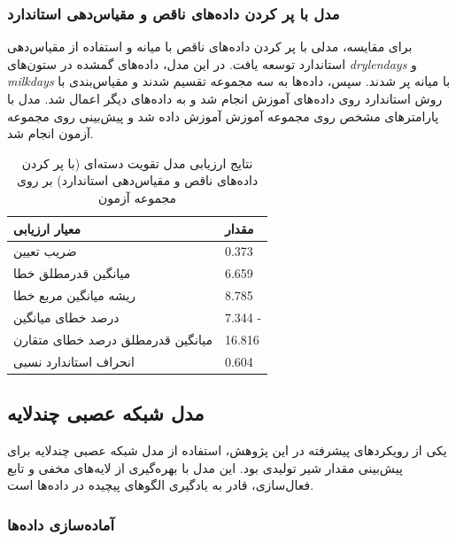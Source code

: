 \subsubsection{مدل با پر کردن داده‌های ناقص و مقیاس‌دهی استاندارد}

برای مقایسه، مدلی با پر کردن داده‌های ناقص با میانه و استفاده از مقیاس‌دهی استاندارد توسعه یافت. در این مدل، داده‌های گمشده در ستون‌های \textit{drylendays} و \textit{milkdays} با میانه پر شدند. سپس، داده‌ها به سه مجموعه تقسیم شدند و مقیاس‌بندی با روش استاندارد روی داده‌های آموزش انجام شد و به داده‌های دیگر اعمال شد. مدل با پارامترهای مشخص روی مجموعه آموزش آموزش داده شد و پیش‌بینی روی مجموعه آزمون انجام شد.

\vspace{0.3cm}
\begin{table}[H]
	\centering
	\caption{نتایج ارزیابی مدل تقویت دسته‌ای (با پر کردن داده‌های ناقص و مقیاس‌دهی استاندارد) بر روی مجموعه آزمون}
	\renewcommand{\arraystretch}{1.3}
	\begin{tabular}{
			>{\centering\arraybackslash}m{4cm}
			>{\centering\arraybackslash}m{3cm}
		}
		\toprule
		\textbf{معیار ارزیابی} & \textbf{مقدار} \\
		\midrule
		ضریب تعیین & \num{0.373} \\
		میانگین قدرمطلق خطا & \num{6.659} \\
		ریشه میانگین مربع خطا & \num{8.785} \\
		درصد خطای میانگین & \num{7.344} - \\
		میانگین قدرمطلق درصد خطای متقارن & \num{16.816} \\
		انحراف استاندارد نسبی & \num{0.604} \\
		\bottomrule
	\end{tabular}
	\label{tab:catboost_standard}
\end{table}
\vspace{0.5cm}



\subsection{مدل شبکه عصبی چندلایه}

یکی از رویکردهای پیشرفته در این پژوهش، استفاده از مدل شبکه عصبی چندلایه برای پیش‌بینی مقدار شیر تولیدی بود. این مدل با بهره‌گیری از لایه‌های مخفی و تابع فعال‌سازی، قادر به یادگیری الگوهای پیچیده در داده‌ها است.

\subsubsection{آماده‌سازی داده‌ها}

